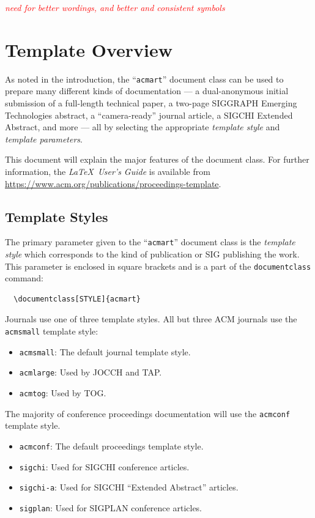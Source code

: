 \documentclass[manuscript,screen,review]{acmart}
\newcommand{\com}[1]{\textcolor{red}{\textit{#1}}}
\begin{document}
\begin{itemize}
	\com{need for better wordings, and better and consistent symbols}
	
	
\end{itemize}

\section{Template Overview}
As noted in the introduction, the ``\verb|acmart|'' document class can
be used to prepare many different kinds of documentation --- a
dual-anonymous initial submission of a full-length technical paper, a
two-page SIGGRAPH Emerging Technologies abstract, a ``camera-ready''
journal article, a SIGCHI Extended Abstract, and more --- all by
selecting the appropriate {\itshape template style} and {\itshape
  template parameters}.

This document will explain the major features of the document
class. For further information, the {\itshape \LaTeX\ User's Guide} is
available from
\url{https://www.acm.org/publications/proceedings-template}.

\subsection{Template Styles}

The primary parameter given to the ``\verb|acmart|'' document class is
the {\itshape template style} which corresponds to the kind of publication
or SIG publishing the work. This parameter is enclosed in square
brackets and is a part of the {\verb|documentclass|} command:
\begin{verbatim}
  \documentclass[STYLE]{acmart}
\end{verbatim}

Journals use one of three template styles. All but three ACM journals
use the {\verb|acmsmall|} template style:
\begin{itemize}
\item {\verb|acmsmall|}: The default journal template style.
\item {\verb|acmlarge|}: Used by JOCCH and TAP.
\item {\verb|acmtog|}: Used by TOG.
\end{itemize}

The majority of conference proceedings documentation will use the {\verb|acmconf|} template style.
\begin{itemize}
\item {\verb|acmconf|}: The default proceedings template style.
\item{\verb|sigchi|}: Used for SIGCHI conference articles.
\item{\verb|sigchi-a|}: Used for SIGCHI ``Extended Abstract'' articles.
\item{\verb|sigplan|}: Used for SIGPLAN conference articles.
\end{itemize}
\end{document}
